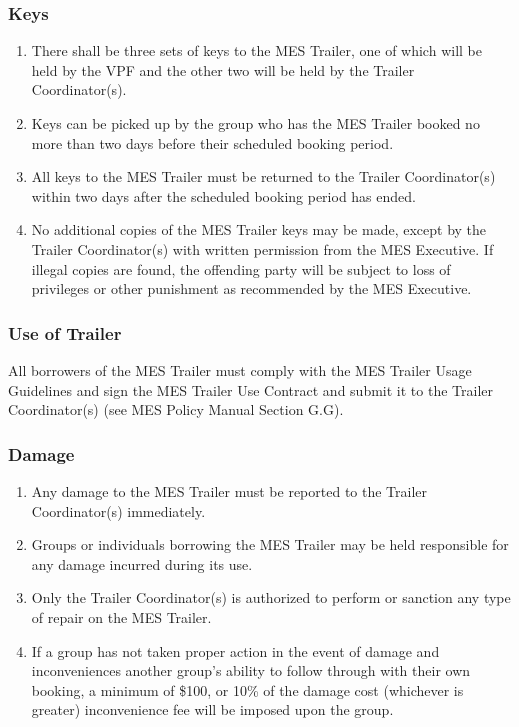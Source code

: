 \subsubsection{Keys}
\label{keys}
\begin{enumerate}
 \item
  There shall be three sets of keys to the MES Trailer, one of which
  will be held by the VPF and the other two will be held by the Trailer
  Coordinator(s).
 \item
  Keys can be picked up by the group who has the MES Trailer booked no
  more than two days before their scheduled booking period.
 \item
  All keys to the MES Trailer must be returned to the Trailer
  Coordinator(s) within two days after the scheduled booking period has
  ended.
 \item
  No additional copies of the MES Trailer keys may be made, except by
  the Trailer Coordinator(s) with written permission from the MES
  Executive. If illegal copies are found, the offending party will be
  subject to loss of privileges or other punishment as recommended by
  the MES Executive.

\end{enumerate}

\subsubsection{Use of Trailer}
\label{use-of-trailer}
All borrowers of the MES Trailer must comply with the MES Trailer Usage
Guidelines and sign the MES Trailer Use Contract and submit it to the
Trailer Coordinator(s) (see MES Policy Manual Section G.G). %

\subsubsection{Damage}
\label{damage}

\begin{enumerate}
 \item
  Any damage to the MES Trailer must be reported to the Trailer
  Coordinator(s) immediately.
 \item
  Groups or individuals borrowing the MES Trailer may be held
  responsible for any damage incurred during its use.
 \item
  Only the Trailer Coordinator(s) is authorized to perform or sanction
  any type of repair on the MES Trailer.
 \item
  If a group has not taken proper action in the event of damage and
  inconveniences another group's ability to follow through with their
  own booking, a minimum of \$100, or 10\% of the damage cost (whichever
  is greater) inconvenience fee will be imposed upon the group.

\end{enumerate}

